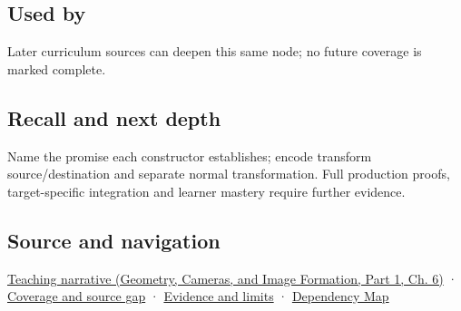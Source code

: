 \subsection{Used by}\label{appendix-380a220e2529-used-by}

\hypertarget{appendix-380a220e2529-used-by}{}

Later curriculum sources can deepen this same node; no future coverage is marked complete.

\subsection{Recall and next depth}\label{appendix-380a220e2529-recall-and-next-depth}

\hypertarget{appendix-380a220e2529-recall-and-next-depth}{}

Name the promise each constructor establishes; encode transform source/destination and separate normal transformation. Full production proofs, target-specific integration and learner mastery require further evidence.

\subsection{Source and navigation}\label{appendix-380a220e2529-source-and-navigation}

\hypertarget{appendix-380a220e2529-source-and-navigation}{}

\href{../03-Geometry-Cameras-and-Image-Formation-P01/main.pdf\#nameddest=02-foundations-ii-ch037-types-can-remember-the-promises-that-three-components-forget}{Teaching narrative (Geometry, Cameras, and Image Formation, Part 1, Ch. 6)} · \hyperref[appendix-fd090d982a15-phase-6---parts-501-600]{Coverage and source gap} · \hyperref[appendix-a103e7846d21-phase-6---source-analysis-and-verification]{Evidence and limits} · \hyperref[appendix-4ad47bdd269a]{Dependency Map}
